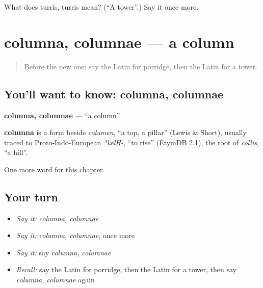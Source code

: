 \begin{tcolorbox}[breakable,colback=teal!4,colframe=teal!35!black,title={Before you move on}]
What does turris, turris mean? (\textquotedblleft{}A tower\textquotedblright{}.) Say it once more.
\end{tcolorbox}
\section[columna, columnae]{columna, columnae — a column}

\label{lesson:LA-C280-columna}



\begin{quote}
Before the new one: say the Latin for porridge, then the Latin for a tower.
\end{quote}

\subsection*{You'll want to know: columna, columnae}
\textbf{columna, columnae} — \textquotedblleft{}a column\textquotedblright{}.

\begin{cousinweb}
\textbf{columna} is a form beside \emph{columen}, \textquotedblleft{}a top, a pillar\textquotedblright{} (Lewis \& Short), usually traced to Proto-Indo-European \emph{*kelH-}, \textquotedblleft{}to rise\textquotedblright{} (EtymDB 2.1), the root of \emph{collis}, \textquotedblleft{}a hill\textquotedblright{}.
\end{cousinweb}

\begin{grammarlens}[title={What you've built}]
One more word for this chapter.
\end{grammarlens}

\subsection*{Your turn}
\begin{itemize}
\raggedright
  \item \emph{Say it:} \emph{columna, columnae}
  \item \emph{Say it:} \emph{columna, columnae}, once more
  \item \emph{Say it:} say \emph{columna, columnae}
  \item \emph{Recall:} say the Latin for porridge, then the Latin for a tower, then say \emph{columna, columnae} again
\end{itemize}

